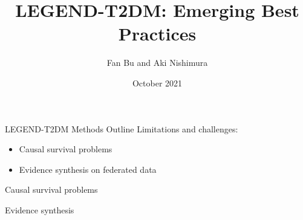 \documentclass[aspectratio=169,xcolor=dvipsnames]{beamer}					%
\title{\hspace{0.2in}LEGEND-T2DM: Emerging Best Practices}	%
\author{Fan Bu and Aki Nishimura}								%
\institute{on behalf of the LEGEND initiative}					%
\date{October 2021}
\begin{document}
{
%
\begin{frame}[plain]
  \titlepage
\end{frame}
}

{
\begin{frame}{LEGEND-T2DM Methods Outline}
Limitations and challenges:
\begin{itemize}
    \item Causal survival problems
    \item Evidence synthesis on federated data
\end{itemize}
\end{frame}
}

{
\begin{frame}{Causal survival problems}


\end{frame}
}

{
\begin{frame}{Evidence synthesis}


\end{frame}
}
\end{document}
